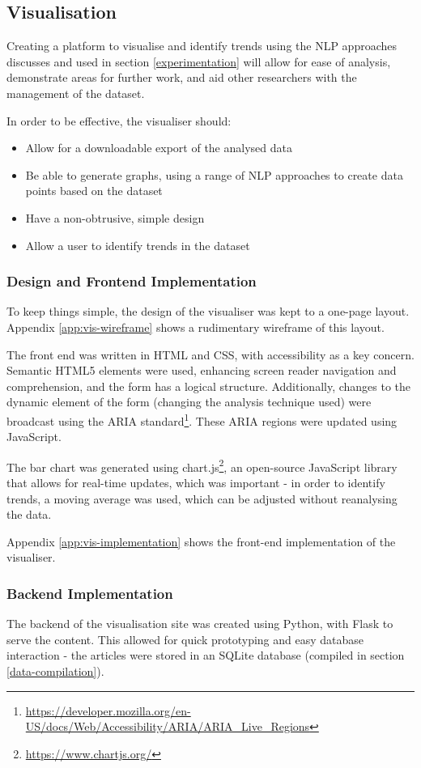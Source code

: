 \subsection{Visualisation}

Creating a platform to visualise and identify trends using the NLP approaches discusses and used in section \ref{experimentation} will allow for ease of analysis, demonstrate areas for further work, and aid other researchers with the management of the dataset.

In order to be effective, the visualiser should:
\begin{itemize}
	\item Allow for a downloadable export of the analysed data
	\item Be able to generate graphs, using a range of NLP approaches to create data points based on the dataset
	\item Have a non-obtrusive, simple design	
	\item Allow a user to identify trends in the dataset
\end{itemize}


\subsubsection{Design and Frontend Implementation}
To keep things simple, the design of the visualiser was kept to a one-page layout. Appendix \ref{app:vis-wireframe} shows a rudimentary wireframe of this layout. 

The front end was written in HTML and CSS, with accessibility as a key concern. Semantic HTML5 elements were used, enhancing screen reader navigation and comprehension, and the form has a logical structure. Additionally, changes to the dynamic element of the form (changing the analysis technique used) were broadcast using the ARIA standard\footnote{\url{https://developer.mozilla.org/en-US/docs/Web/Accessibility/ARIA/ARIA_Live_Regions}}. These ARIA regions were updated using JavaScript.

The bar chart was generated using chart.js\footnote{\url{https://www.chartjs.org/}}, an open-source JavaScript library that allows for real-time updates, which was important - in order to identify trends, a moving average was used, which can be adjusted without reanalysing the data.

Appendix \ref{app:vis-implementation} shows the front-end implementation of the visualiser.


\subsubsection{Backend Implementation}
The backend of the visualisation site was created using Python, with Flask to serve the content. This allowed for quick prototyping and easy database interaction - the articles were stored in an SQLite database (compiled in section \ref{data-compilation}).

